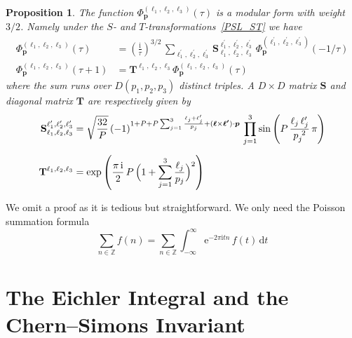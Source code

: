 \documentclass[12pt,reqno]{amsart}
\numberwithin{equation}{section}
\newtheorem{prop}[theorem]{Proposition}
\begin{document}
\begin{prop}
  The function $\Phi_{\boldsymbol{p}}^{(\ell_1, \ell_2, \ell_3)}(\tau)$ is a
  modular form with weight $3/2$.
  Namely under the ${S}$- and ${T}$-transformations~\eqref{PSL_ST}
  we have
  \begin{align}
    \label{S_transformation}
    \Phi_{\boldsymbol{p}}^{(\ell_1, \ell_2, \ell_3)}(\tau)
    & =
    \left(
      \frac{\mathrm{i}}{\tau}
    \right)^{3/2} \,
    \sum_{\ell_1^\prime, \ell_2^\prime, \ell_3^\prime}
    \mathbf{S}_{\ell_1, \ell_2, \ell_3}^{\ell_1^\prime, \ell_2^\prime,
      \ell_3^\prime} \,
    \Phi_{\boldsymbol{p}}^{(\ell_1^\prime, \ell_2^\prime,
      \ell_3^\prime)}(-1/\tau)
    \\[2mm]
%
    \Phi_{\boldsymbol{p}}^{(\ell_1, \ell_2, \ell_3)}(\tau+1)
    & =
    \mathbf{T}^{\ell_1, \ell_2, \ell_3}
    \Phi_{\boldsymbol{p}}^{(\ell_1, \ell_2, \ell_3)}(\tau)
  \end{align}
  where the sum runs over $D(p_1,p_2,p_3)$ distinct triples.
  A $D\times D$ matrix $\mathbf{S}$ and
  diagonal matrix $\mathbf{T}$  are respectively given by
  \begin{align}
    \mathbf{S}_{\ell_1, \ell_2, \ell_3}^{\ell_1^\prime, \ell_2^\prime,
      \ell_3^\prime} 
    & =
    \sqrt{\frac{32}{P}} \,
    (-1)^{1+ P  + P  \sum_{j=1}^3 \frac{\ell_j + \ell_j^\prime}{p_j}
      + (\boldsymbol{\ell} \times \boldsymbol{\ell^\prime}) \cdot
      \boldsymbol{p}
    } \,
    \prod_{j=1}^3
    \sin \left(
      P \, \frac{\ell_j \, \ell_j^\prime}{p_j^{~2}}  \, \pi
    \right)
    \\[2mm]
%
    \mathbf{T}^{\ell_1, \ell_2, \ell_3}
    & =
    \exp \left(
      \frac{\pi \, \mathrm{i} }{2} \, P \,
      \Bigl(
      1+ \sum_{j=1}^3 \frac{\ell_j}{p_j}
      \Bigr)^2
    \right)
  \end{align}
\end{prop}

We omit a proof as it is tedious but straightforward.
We only need the Poisson summation formula
\begin{equation}
  \sum_{n \in \mathbb{Z}} f(n)
  =
  \sum_{n \in \mathbb{Z}}
  \int_{-\infty}^\infty
  \mathrm{e}^{-2 \pi \mathrm{i} t n} \,
  f(t) \,
  \mathrm{d} t
\end{equation}








\section{The Eichler Integral and the Chern--Simons Invariant}
\label{sec:Eichler}
\end{document}
